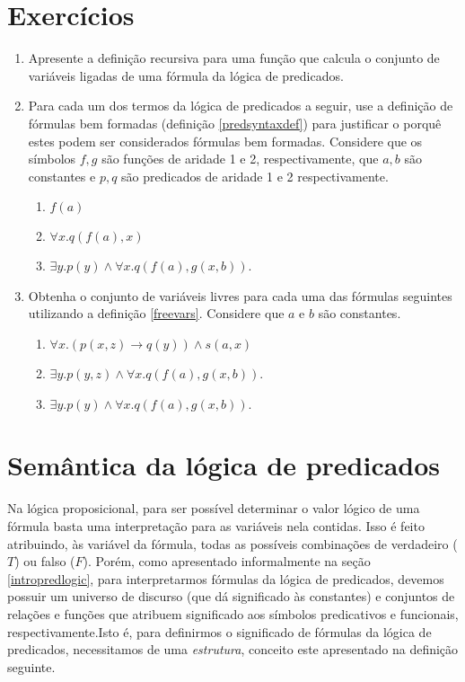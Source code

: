 \section{Exercícios} \label{exsyntaxpred}

\begin{enumerate}
  \item Apresente a definição recursiva para uma função que calcula o
    conjunto de variáveis ligadas de uma fórmula da lógica de
    predicados. \label{boundex}
  \item Para cada um dos termos da lógica de predicados a seguir, use
    a definição de fórmulas bem formadas (definição
    \ref{predsyntaxdef}) para justificar o porquê estes podem ser
    considerados fórmulas bem formadas. Considere que os símbolos $f,
    g$ são funções de aridade 1 e 2, respectivamente, que $a,b$ são
    constantes e $p, q$ são predicados de aridade 1 e 2
    respectivamente.
    \begin{enumerate}
      \item $f(a)$
      \item $\forall x. q(f(a),x)$
      \item $\exists y. p(y) \land \forall x. q(f(a),g(x,b))$.
    \end{enumerate}
    \item Obtenha o conjunto de variáveis livres para cada uma das
      fórmulas seguintes utilizando a definição
      \ref{freevars}. Considere que $a$ e $b$ são constantes.
    \begin{enumerate}
		\item $\forall x. (p(x,z)\rightarrow q(y)) \land
                  s(a,x)$
                \item $\exists y. p(y,z) \land \forall
                  x. q(f(a),g(x,b))$.
                \item $\exists y. p(y) \land \forall x. q(f(a),g(x,b))$.
    \end{enumerate}
\end{enumerate}

\section{Semântica da lógica de predicados}

Na lógica proposicional, para ser possível determinar o valor lógico
de uma fórmula basta uma interpretação para as variáveis nela
contidas. Isso é feito atribuindo, às variável da fórmula, todas as
possíveis combinações de verdadeiro ($T$) ou falso ($F$). Porém, como
apresentado informalmente na seção \ref{intropredlogic}, para
interpretarmos fórmulas da lógica de predicados, devemos possuir um
universo de discurso (que dá significado às constantes) e conjuntos de
relações e funções que atribuem significado aos símbolos predicativos
e funcionais, respectivamente.Isto é, para definirmos o significado de
fórmulas da lógica de predicados, necessitamos de uma
\textit{estrutura}, conceito este apresentado na definição seguinte.

